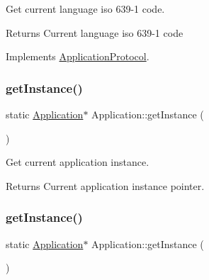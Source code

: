 Get current language iso 639-\/1 code. 

\begin{DoxyReturn}{Returns}
Current language iso 639-\/1 code 
\end{DoxyReturn}


Implements \hyperlink{classApplicationProtocol_a4cb7a696dd51fee3ebb3075f0cca1455}{Application\+Protocol}.

\mbox{\label{classApplication_ab5dba709d2e806d5d83c297bab6cdace}} 
\subsubsection{\texorpdfstring{get\+Instance()}{getInstance()}\hspace{0.1cm}{\footnotesize\ttfamily [1/12]}}
{\footnotesize\ttfamily static \hyperlink{classApplication}{Application}$\ast$ Application\+::get\+Instance (\begin{DoxyParamCaption}{ }\end{DoxyParamCaption})\hspace{0.3cm}{\ttfamily [static]}}



Get current application instance. 

\begin{DoxyReturn}{Returns}
Current application instance pointer. 
\end{DoxyReturn}
\mbox{\label{classApplication_ab5dba709d2e806d5d83c297bab6cdace}} 
\subsubsection{\texorpdfstring{get\+Instance()}{getInstance()}\hspace{0.1cm}{\footnotesize\ttfamily [2/12]}}
{\footnotesize\ttfamily static \hyperlink{classApplication}{Application}$\ast$ Application\+::get\+Instance (\begin{DoxyParamCaption}{ }\end{DoxyParamCaption})\hspace{0.3cm}{\ttfamily [static]}}



